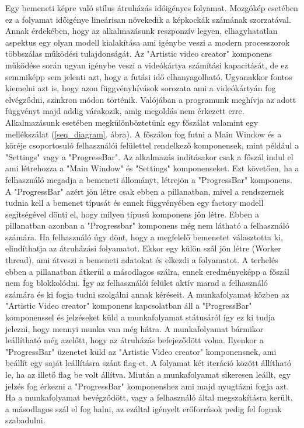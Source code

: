 \documentclass[12pt, a4paper, oneside]{book}
\theoremstyle{tetel}
\begin{document}
Egy bemeneti képre való stílus átruházás időigényes folyamat. Mozgókép esetében ez a folyamat időigénye lineárisan növekedik a képkockák számának szorzatával. Annak érdekében, hogy az alkalmazásunk reszponzív legyen, elhagyhatatlan aspektus egy olyan modell kialakítása ami igénybe veszi a modern processzorok többszálas működési tulajdonságát. Az "Artistic video creator" komponens működése során ugyan igénybe veszi a videókártya számítási kapacitását, de ez semmiképp sem jelenti azt, hogy a futási idő elhanyagolható. Ugyanakkor fontos kiemelni azt is, hogy azon függvényhívások sorozata ami a videókártyán fog elvégződni, szinkron módon történik. Valójában a programunk meghívja az adott függvényt majd addig várakozik, amig megoldás nem érkezett erre.
\newline
\indent
Alkalmazásunk esetében megkülönböztetünk egy főszálat valamint egy mellékszálat (\ref{seq_diagram}. ábra). A főszálon fog futni a Main Window és a köréje csoportosuló felhasználói felülettel rendelkező komponensek, mint például a "Settings" vagy a "ProgressBar". Az alkalmazás indításakor csak a főszál indul el ami létrehozza a "Main Window" és "Settings" komponenseket. Ezt követően, ha a felhasználó megadja a bemeneti állományt, létrejön a "ProgressBar" komponens. A "ProgressBar" azért jön létre csak ebben a pillanatban, mivel a rendszernek tudnia kell a bemenet típusát és ennek függvényében egy factory modell segítségével dönti el, hogy milyen típusú komponens jön létre. Ebben a pillanatban azonban a "Progressbar" komponens még nem látható a felhasználó számára.
\newline
\indent
Ha felhasználó úgy dönt, hogy a megfelelő bemenetet választotta ki, elindíthatja az átruházási folyamatot. Ekkor egy külön szál jön létre (Worker thread), ami átveszi a bemeneti adatokat és elkezdi a folyamatot. A terhelés ebben a pillanatban átkerül a másodlagos szálra, ennek eredményeképp a főszál nem fog blokkolódni. Így az felhasználói felület aktív marad a felhasználó számára és ki fogja tudni szolgálni annak kéréseit.
A munkafolyamat közben az "Artistic Video creator" komponens kapcsolatban áll a "ProgressBar" komponenssel és jelzéseket küld a munkafolyamat státusáról így ez ki tudja jelezni, hogy mennyi munka van még hátra. A munkafolyamat bármikor leállítható még azelőtt, hogy az átruházás befejeződött volna. Ilyenkor a "ProgressBar" üzenetet küld az "Artistic Video creator" komponensnek, ami beállít egy saját leállításra szánt flag-et. A folyamat két iteráció között állítható le, ha az illető flag be volt állítva. Miután a munkafolyamat sikeresen leállt, egy jelzés fog érkezni a "ProgressBar" komponenshez ami majd nyugtázni fogja azt. Ha a munkafolyamat bevégződött, vagy a felhasználó által megszakításra került, a másodlagos szál el fog halni, az ezáltal igényelt erőforrások pedig fel fognak szabadulni.
\end{document}
